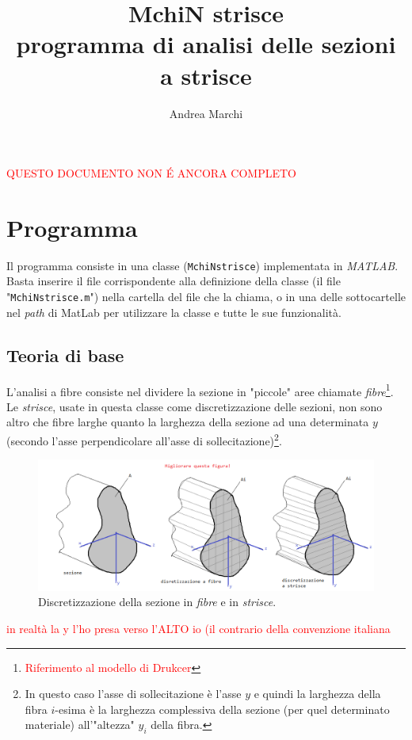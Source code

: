 \documentclass[10pt]{article}
\begin{document}
\title{\Huge{\textbf{MchiN strisce}}\\ \Large{programma di analisi delle sezioni a strisce}}
\author{Andrea Marchi}

\maketitle

\begin{center}
\begin{Huge}
\textcolor{red}{QUESTO DOCUMENTO NON É ANCORA COMPLETO}
\end{Huge}
\end{center}

\tableofcontents

\newpage




\section{Programma}

Il programma consiste in una classe (\texttt{MchiNstrisce}) implementata in \textit{MATLAB}. Basta inserire il file corrispondente alla definizione della classe (il file "\texttt{MchiNstrisce.m}") nella cartella del file che la chiama, o in una delle sottocartelle nel \textit{path} di MatLab per utilizzare la classe e tutte le sue funzionalità.

\subsection{Teoria di base}

L'analisi a fibre consiste nel dividere la sezione in "piccole" aree chiamate \textit{fibre}\footnote{\textcolor{red}{Riferimento al modello di Drukcer}}. Le \textit{strisce}, usate in questa classe come discretizzazione delle sezioni, non sono altro che fibre larghe quanto la larghezza della sezione ad una determinata $y$ (secondo l'asse perpendicolare all'asse di sollecitazione)\footnote{In questo caso l'asse di sollecitazione è l'asse $y$ e quindi la larghezza della fibra $i$-esima è la larghezza complessiva della sezione (per quel determinato materiale) all'"altezza" $y_i$ della fibra.}.

\begin{figure}[H]
\centering
\includegraphics[width=\textwidth]{img/discretizzazione_sezione.png}
\caption{\footnotesize Discretizzazione della sezione in \emph{fibre} e in \emph{strisce}.}
\end{figure}
\textcolor{red}{in realtà la y l'ho presa verso l'ALTO io (il contrario della convenzione italiana}
\end{document}
